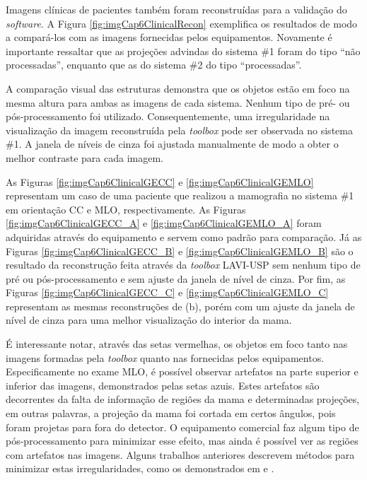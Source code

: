 Imagens clínicas de pacientes também foram reconstruídas para a validação do \textit{software}. A Figura \ref{fig:imgCap6ClinicalRecon} exemplifica os resultados de modo a compará-los com as imagens fornecidas pelos equipamentos. Novamente é importante ressaltar que as projeções advindas do sistema \#1 foram do tipo ``não processadas'', enquanto que as do sistema \#2 do tipo ``processadas''. 

A comparação visual das estruturas demonstra que os objetos estão em foco na mesma altura para ambas as imagens de cada sistema. Nenhum tipo de pré- ou pós-processamento foi utilizado. Consequentemente, uma irregularidade na visualização da imagem reconstruída pela \textit{toolbox} pode ser observada no sistema \#1. A janela de níveis de cinza foi ajustada manualmente de modo a obter o melhor contraste para cada imagem.

As Figuras \ref{fig:imgCap6ClinicalGECC} e \ref{fig:imgCap6ClinicalGEMLO} representam um caso de uma paciente que realizou a mamografia no sistema \#1 em orientação \acs{CC} e \acs{MLO}, respectivamente. As Figuras \ref{fig:imgCap6ClinicalGECC_A} e \ref{fig:imgCap6ClinicalGEMLO_A} foram adquiridas através do equipamento e servem como  padrão para comparação. Já as Figuras \ref{fig:imgCap6ClinicalGECC_B} e \ref{fig:imgCap6ClinicalGEMLO_B} são o resultado da reconstrução feita através da \textit{toolbox} LAVI-USP sem nenhum tipo de pré ou pós-processamento e sem ajuste da janela de nível de cinza. Por fim, as Figuras \ref{fig:imgCap6ClinicalGECC_C} e \ref{fig:imgCap6ClinicalGEMLO_C} representam as mesmas reconstruções de (b), porém com um ajuste da janela de nível de cinza para uma melhor visualização do interior da mama.  

É interessante notar, através das setas vermelhas, os objetos em foco tanto nas imagens formadas pela \textit{toolbox} quanto nas fornecidas pelos equipamentos. Especificamente no exame \acs{MLO}, é possível observar artefatos na parte superior e inferior das imagens, demonstrados pelas setas azuis. Estes artefatos são decorrentes da falta de informação de regiões da mama e determinadas projeções, em outras palavras, a projeção da mama foi cortada em certos ângulos, pois foram projetas para fora do detector. O equipamento comercial faz algum tipo de pós-processamento para minimizar esse efeito, mas ainda é possível ver as regiões com artefatos nas imagens. Alguns trabalhos anteriores descrevem métodos para minimizar estas irregularidades, como os demonstrados em  e .


